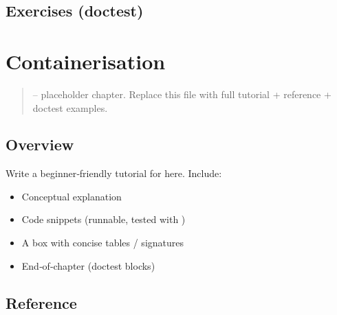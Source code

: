 \documentclass[a4paper,11pt,english]{sphinxmanual}
\begin{document}
\subsection{Exercises (doctest)}
\label{\detokenize{tooling/ci_cd:exercises-doctest}}
\begin{sphinxVerbatim}[commandchars=\\\{\}]
\end{sphinxVerbatim}

\sphinxstepscope


\section{Containerisation}
\label{\detokenize{tooling/containerisation:containerisation}}\label{\detokenize{tooling/containerisation::doc}}\begin{quote}

\sphinxAtStartPar
{} – placeholder chapter. Replace this file with full tutorial + reference + doctest examples.
\end{quote}


\subsection{Overview}
\label{\detokenize{tooling/containerisation:overview}}
\sphinxAtStartPar
Write a beginner‑friendly tutorial for  here. Include:
\begin{itemize}
\item {} 
\sphinxAtStartPar
Conceptual explanation

\item {} 
\sphinxAtStartPar
Code snippets (runnable, tested with )

\item {} 
\sphinxAtStartPar
A  box with concise tables / signatures

\item {} 
\sphinxAtStartPar
End‑of‑chapter  (doctest blocks)

\end{itemize}


\subsection{Reference}
\label{\detokenize{tooling/containerisation:reference}}
\end{document}
